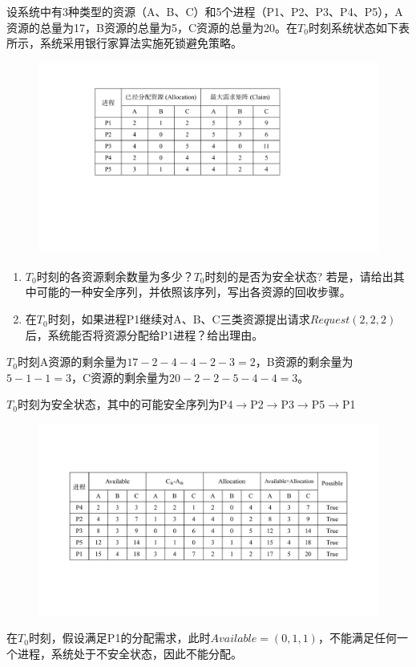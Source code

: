 \begin{problem}
    设系统中有3种类型的资源（A、B、C）和5个进程（P1、P2、P3、P4、P5），A资源的总量为17，B资源的总量为5，C资源的总量为20。在$T_0$时刻系统状态如下表所示，系统采用银行家算法实施死锁避免策略。  
    \begin{figure}[H]
        \vspace{-0.5em}
        \centering
        \includegraphics[width=0.5\linewidth]{期末考试第9题图.pdf}
        \vspace{-1em}
    \end{figure}
    \begin{enumerate}[label=(\arabic*)]
        \item $T_0$时刻的各资源剩余数量为多少？$T_0$时刻的是否为安全状态? 若是，请给出其中可能的一种安全序列，并依照该序列，写出各资源的回收步骤。
        \item 在$T_0$时刻，如果进程P1继续对A、B、C三类资源提出请求$Request(2, 2, 2)$后，系统能否将资源分配给P1进程？给出理由。
    \end{enumerate}

    
\end{problem}
    
\begin{solution}
    $T_0$时刻A资源的剩余量为$17-2-4-4-2-3=2$，B资源的剩余量为$5-1-1=3$，C资源的剩余量为$20-2-2-5-4-4=3$。

    $T_0$时刻为安全状态，其中的可能安全序列为P4$\rightarrow$P2$\rightarrow$P3$\rightarrow$P5$\rightarrow$P1

    \begin{figure}[H]
        \vspace{-0.5em}
        \centering
        \includegraphics[width=0.8\linewidth]{期末考试第9题答案图.pdf}
        \vspace{-1em}
    \end{figure}

    在$T_0$时刻，假设满足P1的分配需求，此时$Available=(0,1,1)$，不能满足任何一个进程，系统处于不安全状态，因此不能分配。
\end{solution}

